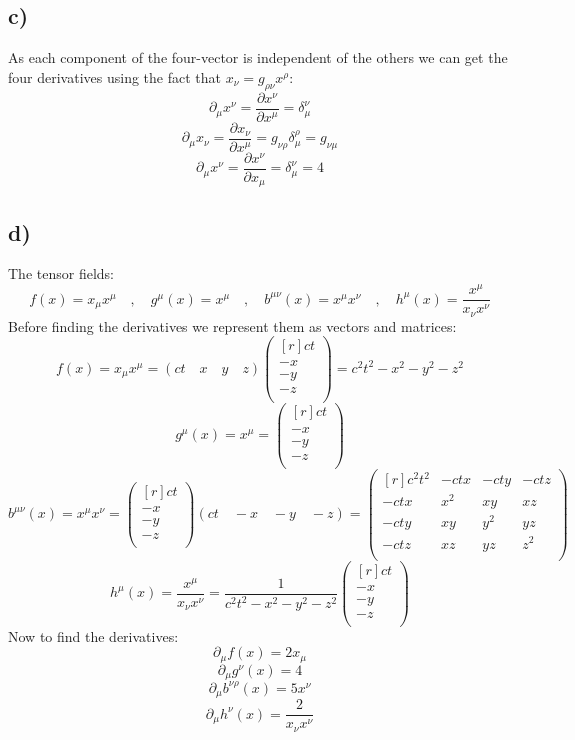 \documentclass{article}
\begin{document}
\subsection*{c)}
As each component of the four-vector is independent of the others we can get the four derivatives using the fact that $x_{ν} = g_{ρν}x^{ρ}$:
\[
∂_{μ}x^{ν} = \frac{∂ x^{ν}}{∂ x^{μ}} = δ^{ν}_{μ}
\]
\[
∂_{μ}x_{ν} = \frac{∂ x_{ν}}{∂ x^{μ}} = g_{νρ}δ^{ρ}_{μ} = g_{νμ}
\]
\[
∂_{μ}x^{ν} = \frac{∂ x^{ν}}{∂ x_{μ}} = δ^{ν}_{μ} = 4
\]

\subsection*{d)}
The tensor fields:
\[
f(x) = x_{μ}x^{μ} \quad , \quad  g^{μ}(x) = x^{μ} \quad , \quad b^{μν}(x) = x^{μ}x^{ν} \quad , \quad h^{μ}(x) = \frac{x^{μ}}{x_{ν}x^{ν}}
\]
Before finding the derivatives we represent them as vectors and matrices:
\[
f(x) = x_{μ}x^{μ} = (ct \quad x \quad y \quad z) 
\begin{pmatrix*}[r]
 ct \\
 -x \\
 -y \\
 -z \\
\end{pmatrix*} = c^2t^2 - x^2 - y^2 - z^2
\]
\[
g^{μ}(x) = x^{μ} = 
\begin{pmatrix*}[r]
 ct \\
 -x \\
 -y \\
 -z \\
\end{pmatrix*}
\]
\[
b^{μν}(x) = x^{μ}x^{ν} = 
\begin{pmatrix*}[r]
 ct \\
 -x \\
 -y \\
 -z \\
\end{pmatrix*}
(ct \quad -x \quad -y \quad -z) =
\begin{pmatrix*}[r]
 c^2t^2 & -ctx  & -cty & -ctz \\
-ctx & x^2 & xy & xz \\
-cty & xy & y^2 & yz \\
-ctz & xz & yz & z^2 \\
\end{pmatrix*}
\]
\[
h^{μ}(x) = \frac{x^{μ}}{x_{ν}x^{ν}} = \frac{1}{c^2t^2 - x^2 - y^2 - z^2}
\begin{pmatrix*}[r]
 ct \\
 -x \\
 -y \\
 -z \\
\end{pmatrix*}
 \]
Now to find the derivatives:
\[
∂_{μ}f(x) = 2x_{μ}
\]
\[
∂_{μ}g^{ν}(x) = 4
\]
\[
∂_{μ}b^{νρ}(x) = 5x^{ν}
\]
\[
∂_{μ}h^{ν}(x) = \frac{2}{x_{ν}x^{ν}}
\]
\end{document}
